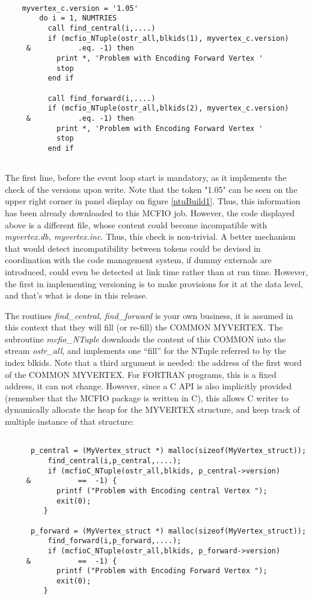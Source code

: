 \begin{verbatim}
  
	myvertex_c.version = '1.05'
        do i = 1, NUMTRIES
          call find_central(i,....)
          if (mcfio_NTuple(ostr_all,blkids(1), myvertex_c.version)
     &           .eq. -1) then 
            print *, 'Problem with Encoding Forward Vertex '
            stop
          end if

          call find_forward(i,....)
          if (mcfio_NTuple(ostr_all,blkids(2), myvertex_c.version)
     &           .eq. -1) then 
            print *, 'Problem with Encoding Forward Vertex '
            stop
          end if
          
\end{verbatim}

	The first line, before the event loop start is mandatory, as it
implements the check of the versions upon write. Note that the token "1.05"
can be seen on the upper right corner in panel display on figure 
\ref{ntuBuild1}.  Thus, this information has been already downloaded to 
this MCFIO job. However, the code displayed above is a different file, 
whose content could become incompatible with {\em myvertex.db,
myvertex.inc}.  Thus, this check is non-trivial. A better mechanism that would
detect incompatibility between tokens could be devised in coordination with the
code management system, if dummy externals are introduced, could even be
detected at link time rather than at run time.  However, the first in
implementing versioning is to make provisions for it at the data level, and
that's what is done in this release. 

The routines {\em find\_central, \em find\_forward} is your own business, it is
assumed in this context that they will fill (or re-fill) the COMMON 
MYVERTEX.   The subroutine {\em mcfio\_NTuple} downloads the content of this
COMMON into the stream {\em ostr\_all}, and implements one ``fill'' for the 
NTuple referred to by the index blkids.  Note that a third argument is needed:  the
address of the first word of the COMMON MYVERTEX. For FORTRAN programs,  this
is a fixed address, it can not change.  However, since a C API is  also
implicitly provided (remember that the MCFIO package is written in C), this
allows C writer to dynamically allocate the heap for the MYVERTEX  structure,
and keep track of multiple instance of that structure:

\begin{verbatim}
  
  	  p_central = (MyVertex_struct *) malloc(sizeof(MyVertex_struct));
          find_central(i,p_central,....);
          if (mcfioC_NTuple(ostr_all,blkids, p_central->version)
     &           ==  -1) {
            printf ("Problem with Encoding central Vertex ");
            exit(0);
         }

  	  p_forward = (MyVertex_struct *) malloc(sizeof(MyVertex_struct));
          find_forward(i,p_forward,....);
          if (mcfioC_NTuple(ostr_all,blkids, p_forward->version)
     &           ==  -1) {
            printf ("Problem with Encoding Forward Vertex ");
            exit(0);
         }
          
\end{verbatim}

